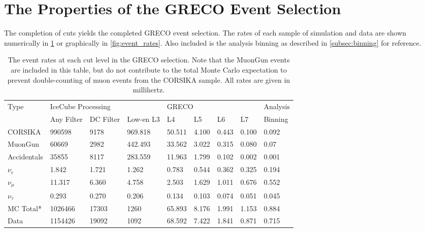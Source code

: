 \graphicspath{{chapters/greco/images/level7/}}
\section{The Properties of the GRECO Event Selection}
The completion of cuts yields the completed GRECO event selection.
The rates of each sample of simulation and data are shown numerically in \ref{tab:event_rates} or graphically in \ref{fig:event_rates}.
Also included is the analysis binning as described in \ref{subsec:binning} for reference.

\begin{table}[]
\centering
\begin{tabular}{@{}lllllllll@{}}
\toprule
Type              & \multicolumn{3}{l}{IceCube Processing}     & \multicolumn{4}{l}{GRECO}             & Analysis         \\ 
                     & Any Filter   & DC Filter  & Low-en L3        & L4         & L5       & L6    & L7          & Binning \\ \midrule
CORSIKA        & 990598     & 9178      & 969.818           & 50.511  & 4.100  & 0.443 & 0.100   & 0.092            \\
MuonGun        & 60669       & 2982      & 442.493          & 33.562  & 3.022   & 0.315 & 0.080   & 0.07             \\
Accidentals    & 35855       & 8117      & 283.559           & 11.963  & 1.799  & 0.102 & 0.002   & 0.001            \\
$\nu_e$        & 1.842        & 1.721     & 1.262               & 0.783    & 0.544  & 0.362 & 0.325   & 0.194            \\
$\nu_{\mu}$ & 11.317      & 6.360     & 4.758               & 2.503    & 1.629  & 1.011 & 0.676   & 0.552            \\
$\nu_{\tau}$ & 0.293        & 0.270     & 0.206              & 0.134    & 0.103  & 0.074 & 0.051   & 0.045            \\ \midrule
MC Total*       & 1026466   & 17303    & 1260               & 65.893  & 8.176  & 1.991 & 1.153   & 0.884            \\
Data              & 1154426   & 19092    & 1092               & 68.592   & 7.422  & 1.841 & 0.871   & 0.715            \\ \bottomrule
\end{tabular}
\caption{The event rates at each cut level in the GRECO selection. Note that the MuonGun events are included in this table, but do not contribute to the total Monte Carlo expectation to prevent double-counting of muon events from the CORSIKA sample. All rates are given in millihertz.}
\label{tab:event_rates}
\end{table}


